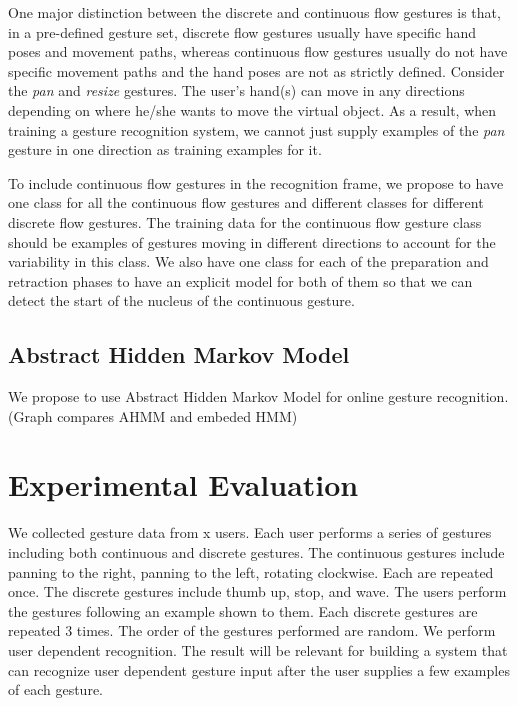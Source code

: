 \documentclass[10pt,twocolumn,letterpaper]{article}
\begin{document}
One major distinction between the discrete and continuous flow gestures is that,
in a pre-defined gesture set, discrete flow gestures usually have specific hand
poses and movement paths, whereas continuous flow gestures usually do not have
specific movement paths and the hand poses are not as strictly defined. Consider 
the \textit{pan} and \textit{resize} gestures. The user's hand(s) can move in any
directions depending on where he/she wants to move the virtual object. As a result, 
when training a gesture recognition system, we cannot just supply examples of the
\textit{pan} gesture in one direction as training examples for it.

To include continuous flow gestures in the recognition frame, we propose to have
one class for all the continuous flow gestures and different classes for different
discrete flow gestures. The training data for the continuous flow gesture class
should be examples of gestures moving in different directions to account for the 
variability in this class. We also have one class for each of the preparation and 
retraction phases to have an explicit model for both of them so that we can detect
the start of the nucleus of the continuous gesture. 

\subsection{Abstract Hidden Markov Model} 
We propose to use Abstract Hidden Markov Model for online gesture recognition.
(Graph compares AHMM and embeded HMM)
 
\section{Experimental Evaluation}

We collected gesture data from x users. Each user performs a series of gestures 
including both continuous and discrete gestures. The continuous gestures include
panning to the right, panning to the left, rotating clockwise. Each are repeated once. 
The discrete gestures include thumb up, stop, and wave. The users
perform the gestures following an example shown to them. Each discrete gestures are 
repeated 3 times. The order of the gestures performed are random. We perform user
dependent recognition. The result will be relevant for building a system that can
recognize user dependent gesture input after the user supplies a few examples of 
each gesture.
\end{document}
